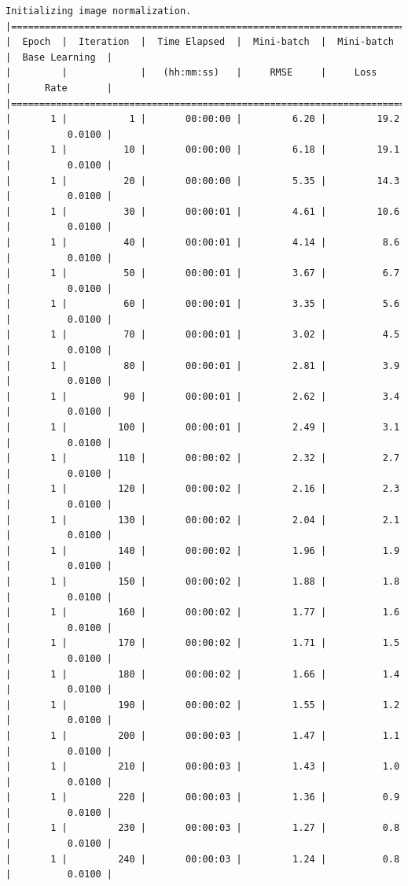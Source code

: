 \documentclass[11pt]{article}
\begin{document}
\begin{Verbatim}[commandchars=\\\{\}]
Initializing image normalization.
|========================================================================================|
|  Epoch  |  Iteration  |  Time Elapsed  |  Mini-batch  |  Mini-batch  |  Base Learning  |
|         |             |   (hh:mm:ss)   |     RMSE     |     Loss     |      Rate       |
|========================================================================================|
|       1 |           1 |       00:00:00 |         6.20 |         19.2 |          0.0100 |
|       1 |          10 |       00:00:00 |         6.18 |         19.1 |          0.0100 |
|       1 |          20 |       00:00:00 |         5.35 |         14.3 |          0.0100 |
|       1 |          30 |       00:00:01 |         4.61 |         10.6 |          0.0100 |
|       1 |          40 |       00:00:01 |         4.14 |          8.6 |          0.0100 |
|       1 |          50 |       00:00:01 |         3.67 |          6.7 |          0.0100 |
|       1 |          60 |       00:00:01 |         3.35 |          5.6 |          0.0100 |
|       1 |          70 |       00:00:01 |         3.02 |          4.5 |          0.0100 |
|       1 |          80 |       00:00:01 |         2.81 |          3.9 |          0.0100 |
|       1 |          90 |       00:00:01 |         2.62 |          3.4 |          0.0100 |
|       1 |         100 |       00:00:01 |         2.49 |          3.1 |          0.0100 |
|       1 |         110 |       00:00:02 |         2.32 |          2.7 |          0.0100 |
|       1 |         120 |       00:00:02 |         2.16 |          2.3 |          0.0100 |
|       1 |         130 |       00:00:02 |         2.04 |          2.1 |          0.0100 |
|       1 |         140 |       00:00:02 |         1.96 |          1.9 |          0.0100 |
|       1 |         150 |       00:00:02 |         1.88 |          1.8 |          0.0100 |
|       1 |         160 |       00:00:02 |         1.77 |          1.6 |          0.0100 |
|       1 |         170 |       00:00:02 |         1.71 |          1.5 |          0.0100 |
|       1 |         180 |       00:00:02 |         1.66 |          1.4 |          0.0100 |
|       1 |         190 |       00:00:02 |         1.55 |          1.2 |          0.0100 |
|       1 |         200 |       00:00:03 |         1.47 |          1.1 |          0.0100 |
|       1 |         210 |       00:00:03 |         1.43 |          1.0 |          0.0100 |
|       1 |         220 |       00:00:03 |         1.36 |          0.9 |          0.0100 |
|       1 |         230 |       00:00:03 |         1.27 |          0.8 |          0.0100 |
|       1 |         240 |       00:00:03 |         1.24 |          0.8 |          0.0100 |

\end{Verbatim}
\end{document}
